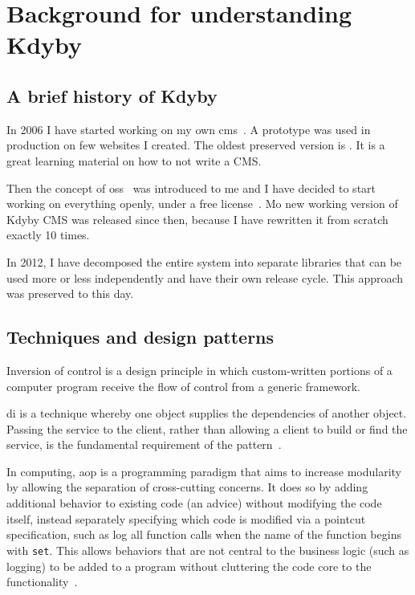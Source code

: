\chapter{Background for understanding Kdyby}

\section{A brief history of Kdyby} \label{sec:theory:kdyby-history}

In 2006 I have started working on my own \gls{cms}~\cite{wiki:cms}. A prototype was used in production on few websites I created. The oldest preserved version is . It is a great learning material on how to not write a CMS.

Then the concept of \gls{oss}~\cite{wiki:oss} was introduced to me and I have decided to start working on everything openly, under a free license~\cite{wiki:fsl}. Mo new working version of Kdyby CMS was released since then, because I have rewritten it from scratch exactly 10 times.

In 2012, I have decomposed the entire system into separate libraries that can be used more or less independently and have their own release cycle. This approach was preserved to this day.

\section{Techniques and design patterns}

 \label{sec:theory:di}

Inversion of control is a design principle in which custom-written portions of a computer program receive the flow of control from a generic framework.

\Gls{di} is a technique whereby one object supplies the dependencies of another object. Passing the service to the client, rather than allowing a client to build or find the service, is the fundamental requirement of the pattern~\cite{fowler:di}.

 \label{sec:theory:aop}

In computing, \gls{aop} is a programming paradigm that aims to increase modularity by allowing the separation of cross-cutting concerns. It does so by adding additional behavior to existing code (an advice) without modifying the code itself, instead separately specifying which code is modified via a pointcut specification, such as log all function calls when the name of the function begins with \lstinline{set}. This allows behaviors that are not central to the business logic (such as logging) to be added to a program without cluttering the code core to the functionality~\cite{wiki:aop}.

